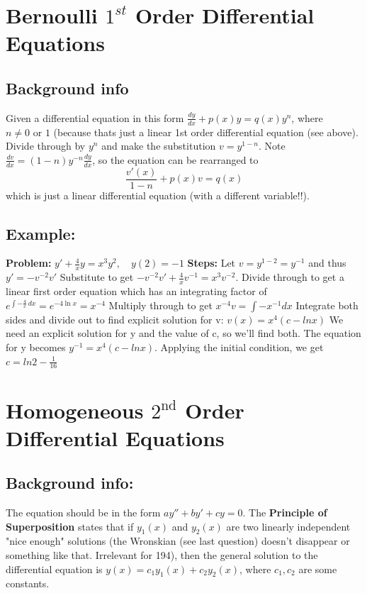\documentclass{article}
\begin{document}
\hypertarget{bernoulliSolve}{
  \section*{Bernoulli $1^{st}$ Order Differential Equations}
  \subsection*{Background info} 
  Given a differential equation in this form $\frac{dy}{dx} + p(x)y=q(x)y^n$, where $n \ne 0 \text{ or } 1$ (because thats just a linear 1st order differential equation (see above). Divide through by $y^n$ and make the substitution $v=y^{1-n}$. Note $\frac{dv}{dx} = (1-n)y^{-n}\frac{dy}{dx}$, so the equation can be rearranged to 
\begin{equation*}
\frac{v'(x)}{1-n} + p(x)v=q(x)
\end{equation*}
which is just a linear differential equation (with a different variable!!).
  \subsection*{Example:}
  \textbf{Problem:}\newline
  $y' + \frac{4}{x} y = x^3 y^2, \quad y(2) = -1$\newline
  \textbf{Steps:}\newline
   Let $v = y^{1 - 2} = y^{-1}$ and thus $y' = -v^{-2} v'$\newline
   Substitute to get $-v^{-2} v' + \frac{4}{x} v^{-1} = x^3 v^{-2}.$\newline
   Divide through to get a linear first order equation which has an integrating factor of $e^{\int -\frac{4}{x} \, dx} = e^{-4 \ln x} = x^{-4}$
	Multiply through to get $x^{-4}v =\int{-x^{-1}dx}$\newline
	Integrate both sides and divide out to find explicit solution for v: $v(x) = x^4(c-lnx)$ \newline
	We need an explicit solution for y and the value of c, so we'll find both. The equation for y becomes $y^{-1} = x^4(c-lnx)$. Applying the initial condition, we get $c= ln2 - \frac{1}{16}$
}
\hypertarget{homogeneousSolve}{
  \section*{Homogeneous $2^{\text{nd}}$ Order Differential Equations}
  \subsection*{Background info:} 
  The equation should be in the form $ay'' + by' + cy = 0$.\newline 
  The \textbf{Principle of Superposition} states that if $y_1(x)$ and $y_2(x)$ are two linearly independent "nice enough" solutions (the Wronskian (see last question) doesn't disappear or something like that. Irrelevant for 194), then the general solution to the differential equation is $y(x) = c_1y_1(x) + c_2y_2(x)$, where $c_1, c_2$ are some constants.\newline
}
\end{document}
